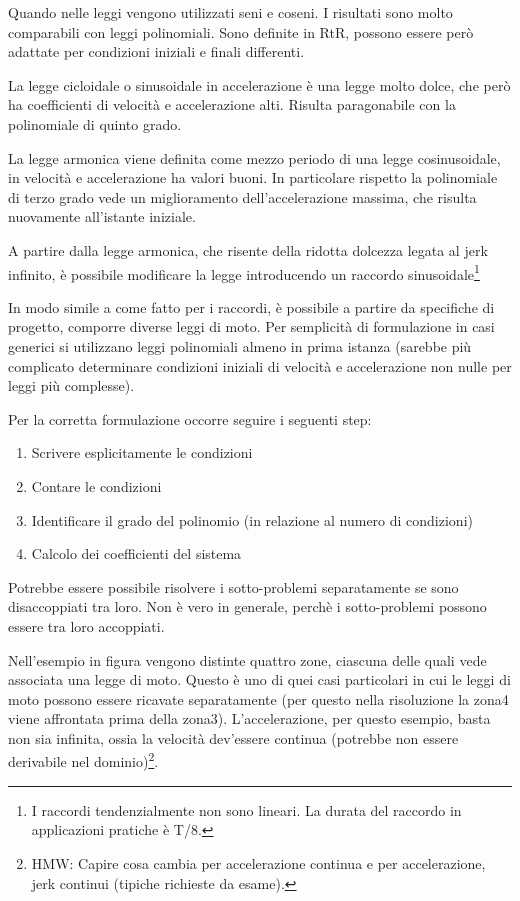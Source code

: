 Quando nelle leggi vengono utilizzati seni e coseni. I risultati sono molto comparabili con leggi polinomiali.
Sono definite in RtR, possono essere però adattate per condizioni iniziali e finali differenti.

La legge cicloidale o sinusoidale in accelerazione è una legge molto dolce, che però ha coefficienti di velocità e accelerazione alti. Risulta paragonabile con la polinomiale di quinto grado.

La legge armonica viene definita come mezzo periodo di una legge cosinusoidale, in velocità e accelerazione ha valori buoni. In particolare rispetto la polinomiale di terzo grado vede un miglioramento dell'accelerazione massima, che risulta nuovamente all'istante iniziale.

A partire dalla legge armonica, che risente della ridotta dolcezza legata al jerk infinito, è possibile modificare la legge introducendo un raccordo sinusoidale\footnote{I raccordi tendenzialmente non sono lineari. La durata del raccordo in applicazioni pratiche è T/8.}

In modo simile a come fatto per i raccordi, è possibile a partire da specifiche di progetto, comporre diverse leggi di moto. Per semplicità di formulazione in casi generici si utilizzano leggi polinomiali almeno in prima istanza (sarebbe più complicato determinare condizioni iniziali di velocità e accelerazione non nulle per leggi più complesse).

Per la corretta formulazione occorre seguire i seguenti step:
\begin{enumerate}
    \item Scrivere esplicitamente le condizioni
    \item Contare le condizioni
    \item Identificare il grado del polinomio (in relazione al numero di condizioni)
    \item Calcolo dei coefficienti del sistema
\end{enumerate}

Potrebbe essere possibile risolvere i sotto-problemi separatamente se sono disaccoppiati tra loro.
Non è vero in generale, perchè i sotto-problemi possono essere tra loro accoppiati.

Nell'esempio in figura vengono distinte quattro zone, ciascuna delle quali vede associata una legge di moto.
Questo è uno di quei casi particolari in cui le leggi di moto possono essere ricavate separatamente (per questo nella risoluzione la zona4 viene affrontata prima della zona3).
L'accelerazione, per questo esempio, basta non sia infinita, ossia la velocità dev'essere continua (potrebbe non essere derivabile nel dominio)\footnote{HMW: Capire cosa cambia per accelerazione continua e per accelerazione, jerk continui (tipiche richieste da esame).}.


